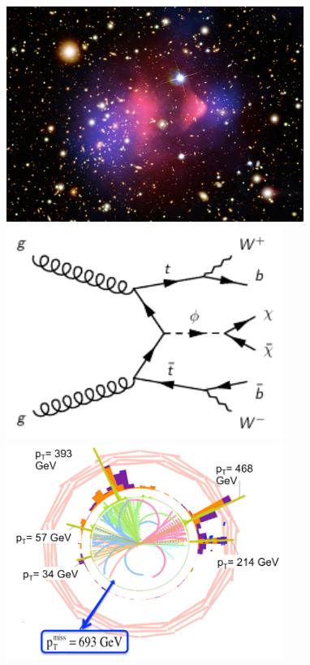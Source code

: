 {{{       }
        \begin{figure}
                           \includegraphics[height=7cm]{bc.jpg}
                           \hspace{3cm}
                           \includegraphics[height=7cm]{DMdiagram.png}
                           \hspace{3cm}
                           \includegraphics[height=7cm]{dmed2.png}

         \end{figure}

}}
